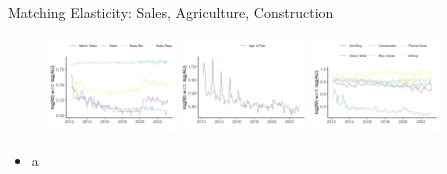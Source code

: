 \documentclass[aspectratio=169]{beamer}
\begin{document}
\begin{frame}{Matching Elasticity: Sales, Agriculture, Construction}
    \begin{figure}[!ht]
  \begin{center}
  \includegraphics[width = 0.30\textwidth]
  {figuretable/elasticity_unemployed_month_aggregate_sales.png}
  \includegraphics[width = 0.30\textwidth]
  {figuretable/elasticity_unemployed_month_aggregate_agriculture_forestry_and_fishing.png}
  \includegraphics[width = 0.30\textwidth]
  {figuretable/elasticity_unemployed_month_aggregate_construction_and_mining.png}
  \end{center}
  \footnotesize
\end{figure} 
    \begin{itemize}
        \item a
    \end{itemize}
\end{frame}
\end{document}
